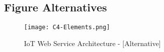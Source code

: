 \subsection{Figure Alternatives}
\begin{figure}[!h]
    \centering
    \texttt{[image: C4-Elements.png]}
    \caption{IoT Web Service Architecture - [Alternative]}\label{fig::arch}
\end{figure}